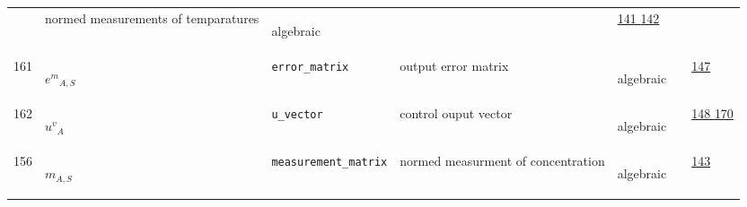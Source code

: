 \begin{longtable}{|p{1cm}|p{2.5cm}|p{4.5cm}|p{8cm}|p{3.0cm}|p{3cm}|p{1cm}|}
             & normed measurements of temparatures
             & \begin{lay}algebraic \end{lay}
             & $  $
             &                 \hyperlink{"e:141"}{ 141 }
                                 \hyperlink{"e:142"}{ 142 }
                 \\
            161
             & \hypertarget{"v:161"}{ $ {{e^{m}}}{_{A, S}} $}
             & \verb|error_matrix|
             & output error matrix
             & \begin{lay}algebraic \end{lay}
             & $  $
             &                 \hyperlink{"e:147"}{ 147 }
                 \\
            162
             & \hypertarget{"v:162"}{ $ {{u^{v}}}{_{A}} $}
             & \verb|u_vector|
             & control ouput vector
             & \begin{lay}algebraic \end{lay}
             & $  $
             &                 \hyperlink{"e:148"}{ 148 }
                                 \hyperlink{"e:170"}{ 170 }
                 \\
            156
             & \hypertarget{"v:156"}{ $ {m}{_{A, S}} $}
             & \verb|measurement_matrix|
             & normed measurment of concentration
             & \begin{lay}algebraic \end{lay}
             & $  $
             &                 \hyperlink{"e:143"}{ 143 }
                 \\
    \end{longtable}